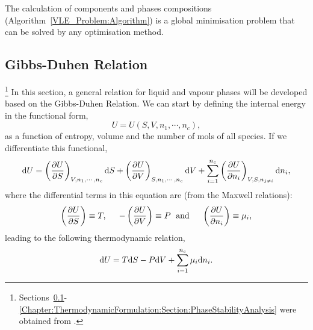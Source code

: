 The calculation of components and phases compositions (Algorithm~\ref{VLE_Problem:Algorithm}) is a global minimisation problem that can be solved by any optimisation method. %


\subsection{Gibbs-Duhen Relation}\label{Chapter:ThermodynamicFormulation:Section:GibbsDuhen}\footnote{Sections~\ref{Chapter:ThermodynamicFormulation:Section:GibbsDuhen}-\ref{Chapter:ThermodynamicFormulation:Section:PhaseStabilityAnalysis} were obtained from \citet{Henderson_Thesis,Henderson_2001}.}
In this section, a general relation for liquid and vapour phases will be developed based on the Gibbs-Duhen Relation. We can start by defining the internal energy in the functional form,
\begin{displaymath}
   U = U\left(S, V, n_{1}, \cdots, n_{c}\right),
\end{displaymath} 
as a function of entropy, volume and the number of mols of all species. If we differentiate this functional,
\begin{displaymath}
   \mathrm{d} U = \left(\displaystyle\frac{\partial U}{\partial S}\right)_{V,n_{1},\cdots,n_{c}}\mathrm{d} S + \left(\displaystyle\frac{\partial U}{\partial V}\right)_{S,n_{1},\cdots,n_{c}}\mathrm{d} V + \sum\limits_{i=1}^{n_{c}} \left(\displaystyle\frac{\partial U}{\partial n_{i}}\right)_{V,S,n_{j\ne i}}\mathrm{d} n_{i},
\end{displaymath}
where the differential terms in this equation are (from the Maxwell relations):
\begin{displaymath}
    \left(\displaystyle\frac{\partial U}{\partial S}\right) \equiv T, \hspace{.5cm} -\left(\displaystyle\frac{\partial U}{\partial V}\right) \equiv P \hspace{.1cm}\text{ and }\hspace{.4cm}  \left(\displaystyle\frac{\partial U}{\partial n_{i}}\right) \equiv \mu_{i},
\end{displaymath}
leading to the following thermodynamic relation,
\begin{equation}
     \mathrm{d} U = T\mathrm{d} S - P\mathrm{d} V + \sum\limits_{i=1}^{n_{c}}\mu_{i}\mathrm{d} n_{i}.\label{Chapter:ThermodynamicFormulation:Eqn:U_FundamentalThermodRelation}
\end{equation}

